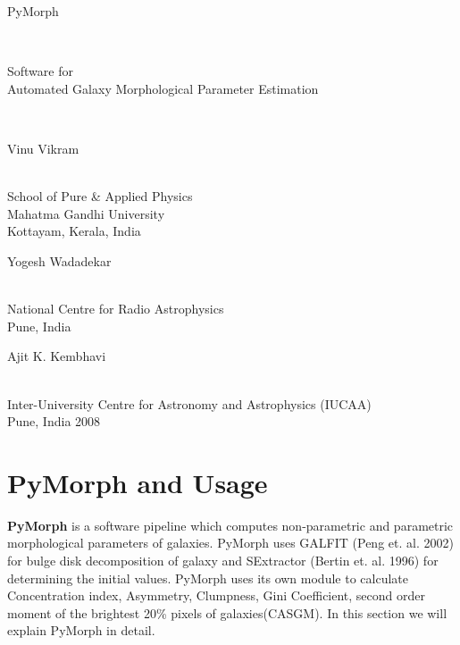 \documentclass[a4paper,10pt]{article}
\begin{document}
\begin{titlepage}
\begin{center}

\begin{Huge}PyMorph\end{Huge}\\
\begin{Large}Software for \\Automated Galaxy Morphological Parameter Estimation\end{Large}\\

\begin{large}
\end{large}
\vspace{5cm}
\vspace{0.5cm}
\begin{Large}Vinu Vikram\end{Large}\\
School of Pure \& Applied Physics\\
Mahatma Gandhi University\\
Kottayam, Kerala, India\\
\vspace{0.3cm}
\begin{Large}Yogesh Wadadekar\end{Large}\\
National Centre for Radio Astrophysics\\
Pune, India\\
\vspace{0.3cm}
\begin{Large}Ajit K. Kembhavi \end{Large}\\
Inter-University Centre for Astronomy and Astrophysics (IUCAA)\\
Pune, India
\vspace{5cm}
2008
\end{center}
\end{titlepage}
\tableofcontents
\clearpage
\section{PyMorph and Usage}
{\bf PyMorph} is a software pipeline which computes non-parametric and parametric morphological parameters of galaxies. PyMorph uses GALFIT (Peng et. al. 2002) for bulge disk decomposition of galaxy and SExtractor (Bertin et. al. 1996) for determining the initial values. PyMorph uses its own module to calculate Concentration index, Asymmetry, Clumpness, Gini Coefficient, second order moment of the brightest 20\% pixels of galaxies(CASGM). In this section we will explain PyMorph in detail.
\end{document}
